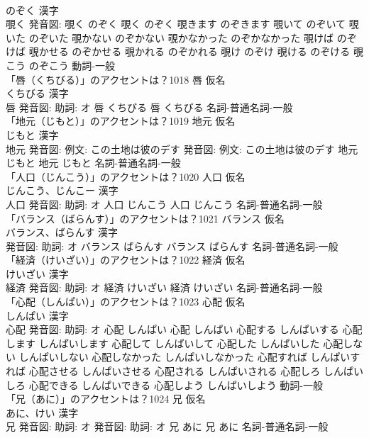\documentclass[8pt]{extreport}
\begin{document}
\begin{CJK}{UTF8}{min}
\\	のぞく 漢字　
\\	覗く 発音図:	覗く のぞく		覗く のぞく 覗きます のぞきます 覗いて のぞいて 覗いた のぞいた 覗かない のぞかない 覗かなかった のぞかなかった 覗けば のぞけば 覗かせる のぞかせる 覗かれる のぞかれる 覗け のぞけ 覗ける のぞける 覗こう のぞこう				動詞-一般 
\\	「唇（くちびる）」のアクセントは？1018	唇 仮名　
\\	くちびる 漢字　
\\	唇 発音図: 助詞: オ	唇 くちびる		唇 くちびる				名詞-普通名詞-一般 
\\	「地元（じもと）」のアクセントは？1019	地元 仮名　
\\	じもと 漢字　
\\	地元 発音図: 例文: この土地は彼のデす 発音図: 例文: この土地は彼のデす	地元 じもと		地元 じもと				名詞-普通名詞-一般 
\\	「人口（じんこう）」のアクセントは？1020	人口 仮名　
\\	じんこう、じんこー 漢字　
\\	人口 発音図: 助詞: オ	人口 じんこう		人口 じんこう				名詞-普通名詞-一般 
\\	「バランス（ばらんす）」のアクセントは？1021	バランス 仮名　
\\	バランス、ばらんす 漢字　
\\	発音図: 助詞: オ	バランス ばらんす		バランス ばらんす				名詞-普通名詞-一般 
\\	「経済（けいざい）」のアクセントは？1022	経済 仮名　
\\	けいざい 漢字　
\\	経済 発音図: 助詞: オ	経済 けいざい		経済 けいざい				名詞-普通名詞-一般 
\\	「心配（しんぱい）」のアクセントは？1023	心配 仮名　
\\	しんぱい 漢字　
\\	心配 発音図: 助詞: オ	心配 しんぱい		心配 しんぱい 心配する しんぱいする 心配します しんぱいします 心配して しんぱいして 心配した しんぱいした 心配しない しんぱいしない 心配しなかった しんぱいしなかった 心配すれば しんぱいすれば 心配させる しんぱいさせる 心配される しんぱいされる 心配しろ しんぱいしろ 心配できる しんぱいできる 心配しよう しんぱいしよう				動詞-一般 
\\	「兄（あに）」のアクセントは？1024	兄 仮名　
\\	あに、けい 漢字　
\\	兄 発音図: 助詞: オ 発音図: 助詞: オ	兄 あに		兄 あに				名詞-普通名詞-一般 

\end{CJK}
\end{document}
